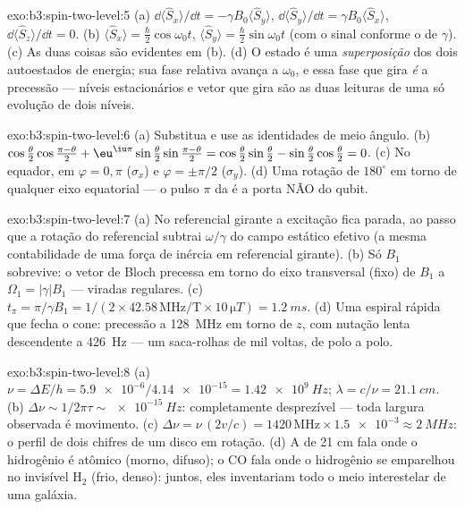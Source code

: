 \begin{solution}{exo:b3:spin-two-level:5}
(a) $\dd\langle\hat S_x\rangle/\dd t = -\gamma B_0\langle\hat
S_y\rangle$, $\dd\langle\hat S_y\rangle/\dd t = \gamma
B_0\langle\hat S_x\rangle$, $\dd\langle\hat S_z\rangle/\dd t = 0$.
(b) $\langle\hat S_x\rangle = \tfrac\hbar2\cos\omega_0t$,
$\langle\hat S_y\rangle = \tfrac\hbar2\sin\omega_0t$ (com o sinal
conforme o de $\gamma$). (c) As duas coisas são evidentes em (b). (d) O
estado é uma \emph{superposição} dos dois autoestados de energia; sua
fase relativa avança a $\omega_0$, e essa fase que gira \emph{é} a
precessão --- níveis estacionários e vetor que gira são as duas
leituras de uma só evolução de dois níveis.
\end{solution}

\begin{solution}{exo:b3:spin-two-level:6}
(a) Substitua e use as identidades de meio ângulo. (b)
$\cos\tfrac\theta2\cos\tfrac{\pi-\theta}2 +
\eu^{\iu\pi}\sin\tfrac\theta2\sin\tfrac{\pi-\theta}2 =
\cos\tfrac\theta2\sin\tfrac\theta2 -
\sin\tfrac\theta2\cos\tfrac\theta2 = 0$. (c) No equador, em
$\varphi = 0, \pi$ ($\sigma_x$) e $\varphi = \pm\pi/2$
($\sigma_y$). (d) Uma rotação de $180^\circ$ em torno de qualquer eixo
equatorial --- o pulso $\pi$ da  é a porta NÃO do
qubit.
\end{solution}

\begin{solution}{exo:b3:spin-two-level:7}
(a) No referencial girante a excitação fica parada, ao passo que a
rotação do referencial subtrai $\omega/\gamma$ do campo estático
efetivo (a mesma contabilidade de uma força de inércia em referencial
girante). (b) Só $B_1$ sobrevive: o vetor de Bloch precessa em torno do
eixo transversal (fixo) de $B_1$ a $\Omega_1 = |\gamma|B_1$ --- viradas
regulares. (c) $t_\pi = \pi/\gamma B_1 = 1/(2 \times 42.58\,\text{
MHz/T} \times 10\,\unit{\micro T}) = \qty{1.2}{ms}$. (d) Uma espiral
rápida que fecha o cone: precessão a \qty{128}{MHz} em torno de $z$,
com nutação lenta descendente a \qty{426}{Hz} --- um saca-rolhas de mil
voltas, de polo a polo.
\end{solution}

\begin{solution}{exo:b3:spin-two-level:8}
(a) $\nu = \Delta E/h = \num{5.9e-6}/\num{4.14e-15} =
\qty{1.42e9}{Hz}$; $\lambda = c/\nu = \qty{21.1}{cm}$. (b) $\Delta
\nu \sim 1/2\pi\tau \sim \qty{e-15}{Hz}$: completamente desprezível ---
toda largura observada é movimento. (c) $\Delta\nu =
\nu\,(2v/c) = 1420\,\text{MHz} \times \num{1.5e-3} \approx
\qty{2}{MHz}$: o perfil de dois chifres de um disco em rotação. (d)
A de 21 cm fala onde o hidrogênio é atômico (morno, difuso); o CO fala
onde o hidrogênio se emparelhou no invisível H$_2$ (frio, denso):
juntos, eles inventariam todo o meio interestelar de uma galáxia.
\end{solution}

